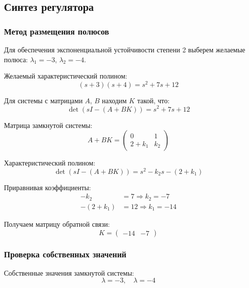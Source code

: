 \subsection{Синтез регулятора}

\subsubsection{Метод размещения полюсов}

Для обеспечения экспоненциальной устойчивости степени 2 выберем желаемые полюса: $\lambda_1 = -3$, $\lambda_2 = -4$.

Желаемый характеристический полином:
\begin{equation}
(s + 3)(s + 4) = s^2 + 7s + 12
\end{equation}

Для системы с матрицами $A$, $B$ находим $K$ такой, что:
\begin{equation}
\det(sI - (A + BK)) = s^2 + 7s + 12
\end{equation}

Матрица замкнутой системы:
\begin{equation}
A + BK = \begin{pmatrix} 0 & 1 \\ 2 + k_1 & k_2 \end{pmatrix}
\end{equation}

Характеристический полином:
\begin{equation}
\det(sI - (A + BK)) = s^2 - k_2s - (2 + k_1)
\end{equation}

Приравнивая коэффициенты:
\begin{align}
-k_2 &= 7 \Rightarrow k_2 = -7 \\
-(2 + k_1) &= 12 \Rightarrow k_1 = -14
\end{align}

Получаем матрицу обратной связи:
\begin{equation}
K = \begin{pmatrix} -14 & -7 \end{pmatrix}
\end{equation}

\subsubsection{Проверка собственных значений}

Собственные значения замкнутой системы:
\begin{equation}
\lambda = -3, \quad \lambda = -4
\end{equation}

